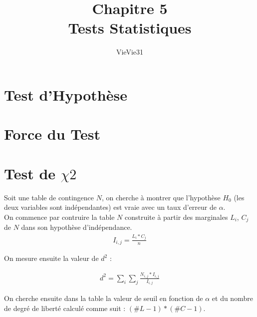 \documentclass{article}
\title{Chapitre 5 \\ Tests Statistiques}
\author{VieVie31}
\begin{document}
\newtheorem{theo}{Théorème}
\newtheorem{coro}{Corollaire}

\newcommand{\argmax}{\operatornamewithlimits{argmax}}
\newcommand{\likelihood}{{\cal L}}

\maketitle

\section{Test d'Hypothèse}


\section{Force du Test}


\section{Test de $\chi2$}

Soit une table de contingence $N$, on cherche à montrer que l'hypothèse $H_0$ (les deux variables sont indépendantes) est vraie avec un taux d'erreur de $\alpha$. \\
On commence par contruire la table $N$ construite à partir des marginales $L_i$, $C_j$ de $N$ dans son hypothèse d'indépendance. \\

\begin{align*}
    I_{i,j} = \frac{L_i * C_j}{n}
\end{align*}

On mesure ensuite la valeur de $d^2$ : 

\begin{align*}
    d^2 = \sum\limits_i \sum\limits_j \frac{N_{i,j} * I_{i,j}}{I_{i,j}}
\end{align*}

On cherche ensuite dans la table la valeur de seuil en fonction de $\alpha$ et du nombre de degré de liberté calculé comme suit : $(\#L - 1) * (\#C - 1)$.
\end{document}
